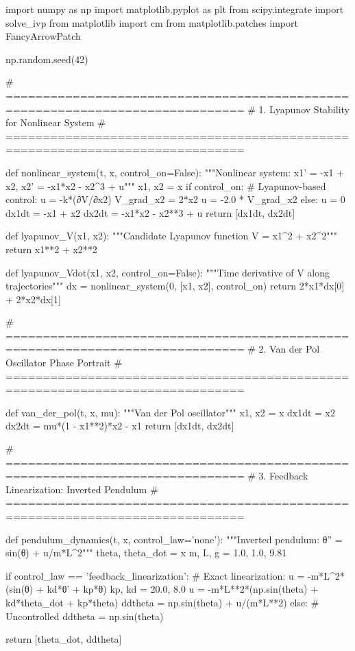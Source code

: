 \documentclass[a4paper, 11pt]{article}
\begin{document}
\begin{pycode}
import numpy as np
import matplotlib.pyplot as plt
from scipy.integrate import solve_ivp
from matplotlib import cm
from matplotlib.patches import FancyArrowPatch

np.random.seed(42)

# ==============================================================================
# 1. Lyapunov Stability for Nonlinear System
# ==============================================================================

def nonlinear_system(t, x, control_on=False):
    """Nonlinear system: x1' = -x1 + x2, x2' = -x1*x2 - x2^3 + u"""
    x1, x2 = x
    if control_on:
        # Lyapunov-based control: u = -k*(∂V/∂x2)
        V_grad_x2 = 2*x2
        u = -2.0 * V_grad_x2
    else:
        u = 0
    dx1dt = -x1 + x2
    dx2dt = -x1*x2 - x2**3 + u
    return [dx1dt, dx2dt]

def lyapunov_V(x1, x2):
    """Candidate Lyapunov function V = x1^2 + x2^2"""
    return x1**2 + x2**2

def lyapunov_Vdot(x1, x2, control_on=False):
    """Time derivative of V along trajectories"""
    dx = nonlinear_system(0, [x1, x2], control_on)
    return 2*x1*dx[0] + 2*x2*dx[1]

# ==============================================================================
# 2. Van der Pol Oscillator Phase Portrait
# ==============================================================================

def van_der_pol(t, x, mu):
    """Van der Pol oscillator"""
    x1, x2 = x
    dx1dt = x2
    dx2dt = mu*(1 - x1**2)*x2 - x1
    return [dx1dt, dx2dt]

# ==============================================================================
# 3. Feedback Linearization: Inverted Pendulum
# ==============================================================================

def pendulum_dynamics(t, x, control_law='none'):
    """Inverted pendulum: θ'' = sin(θ) + u/m*L^2"""
    theta, theta_dot = x
    m, L, g = 1.0, 1.0, 9.81

    if control_law == 'feedback_linearization':
        # Exact linearization: u = -m*L^2*(sin(θ) + kd*θ' + kp*θ)
        kp, kd = 20.0, 8.0
        u = -m*L**2*(np.sin(theta) + kd*theta_dot + kp*theta)
        ddtheta = np.sin(theta) + u/(m*L**2)
    else:
        # Uncontrolled
        ddtheta = np.sin(theta)

    return [theta_dot, ddtheta]


\end{pycode}
\end{document}

